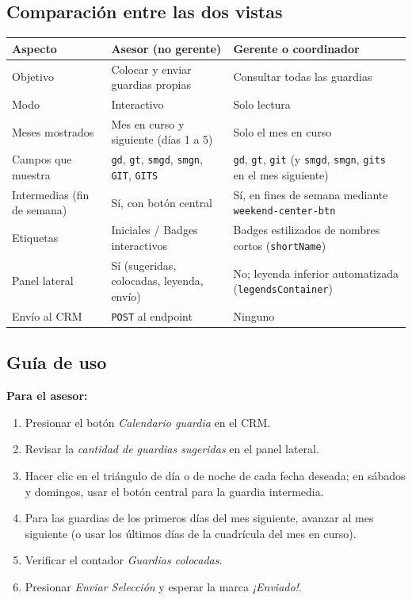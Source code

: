 \documentclass[11pt,a4paper]{article}
\newcommand{\code}[1]{\texttt{#1}}
\begin{document}
\subsection{Comparación entre las dos vistas}
\begin{longtable}{@{}p{3.2cm}p{5.6cm}p{6cm}@{}}
\toprule
\textbf{Aspecto} & \textbf{Asesor (no gerente)} & \textbf{Gerente o coordinador} \\
\midrule
\endhead
Objetivo & Colocar y enviar guardias propias & Consultar todas las guardias \\
Modo & Interactivo & Solo lectura \\
Meses mostrados & Mes en curso y siguiente (días 1 a 5) & Solo el mes en curso \\
Campos que muestra & \code{gd}, \code{gt}, \code{smgd}, \code{smgn}, \code{GIT}, \code{GITS} & \code{gd}, \code{gt}, \code{git} (y \code{smgd}, \code{smgn}, \code{gits} en el mes siguiente) \\
Intermedias (fin de semana) & Sí, con botón central & Sí, en fines de semana mediante \code{weekend-center-btn} \\
Etiquetas & Iniciales / Badges interactivos & Badges estilizados de nombres cortos (\code{shortName}) \\
Panel lateral & Sí (sugeridas, colocadas, leyenda, envío) & No; leyenda inferior automatizada (\code{legendsContainer}) \\
Envío al CRM & \code{POST} al endpoint & Ninguno \\
\bottomrule
\end{longtable}

\subsection{Guía de uso}
\textbf{Para el asesor:}
\begin{enumerate}[nosep]
  \item Presionar el botón \emph{Calendario guardia} en el CRM.
  \item Revisar la \emph{cantidad de guardias sugeridas} en el panel lateral.
  \item Hacer clic en el triángulo de día o de noche de cada fecha deseada; en sábados y domingos, usar el botón central para la guardia intermedia.
  \item Para las guardias de los primeros días del mes siguiente, avanzar al mes siguiente (o usar los últimos días de la cuadrícula del mes en curso).
  \item Verificar el contador \emph{Guardias colocadas}.
  \item Presionar \emph{Enviar Selección} y esperar la marca \emph{¡Enviado!}.
\end{enumerate}
\end{document}
